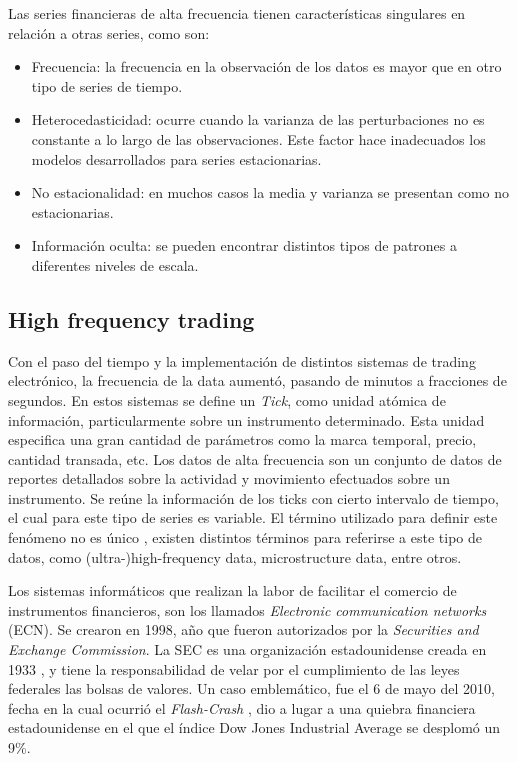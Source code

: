 Las series financieras de alta frecuencia tienen características singulares en relación a otras series, como son: 
\begin{itemize}
	\item Frecuencia: la frecuencia en la observación de los datos es mayor que en otro tipo de series de tiempo.
	\item Heterocedasticidad: ocurre cuando la varianza de las perturbaciones no es constante a lo largo de las observaciones.
		Este factor hace inadecuados los modelos desarrollados para series estacionarias.
	\item No estacionalidad: en muchos casos la media y varianza se presentan como no estacionarias.
	\item Información oculta: se pueden encontrar distintos tipos de patrones a diferentes niveles de escala.
\end{itemize}

\subsection{High frequency trading}

Con el paso del tiempo y la implementación de distintos sistemas de trading electrónico, la frecuencia de la data aumentó, pasando de minutos a fracciones de segundos. 
En estos sistemas se define un \emph{Tick}, como unidad atómica de información, particularmente sobre un instrumento determinado.
Esta unidad especifica una gran cantidad de parámetros como la marca temporal, precio, cantidad transada, etc. Los datos de alta frecuencia son un conjunto de datos 
de reportes detallados sobre la actividad y movimiento efectuados sobre un instrumento. Se reúne la información de los ticks con cierto intervalo de tiempo, 
el cual para este tipo de series es variable. El término utilizado para definir este fenómeno no es único \cite{ei2007quantitative}, existen distintos términos
para referirse a este tipo de datos, como (ultra-)high-frequency data, microstructure data, entre otros. 

Los sistemas informáticos que realizan la labor de facilitar el comercio de instrumentos financieros, son los llamados \emph{Electronic communication networks} (ECN).
Se crearon en 1998, año que fueron autorizados por la \emph{Securities and Exchange Commission}. La SEC es una organización estadounidense creada en 1933 \cite{hasbrouck2004economic}, 
y tiene la responsabilidad de velar por el cumplimiento de las leyes federales las bolsas de valores. Un caso emblemático, fue el 6 de mayo del 2010, fecha en la cual ocurrió el 
\emph{Flash-Crash} \cite{arndt2011high}, dio a lugar a una quiebra financiera estadounidense en el que el índice Dow Jones Industrial Average se desplomó un 9\%.

